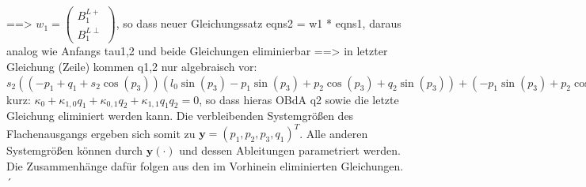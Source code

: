 ==> $w_1 = \left(\begin{matrix}
B_1^{L+} \\
B_1^{L\perp}
\end{matrix} \right)$, so dass neuer Gleichungssatz eqns2 = w1 * eqns1, daraus analog wie Anfangs tau1,2 und beide Gleichungen eliminierbar
==> in letzter Gleichung (Zeile) kommen q1,2 nur algebraisch vor:
$s_{2} \left(\left(- p_{1} + q_{1} + s_{2} \cos{\left(p_{3} \right)}\right) \left(l_{0} \sin{\left(p_{3} \right)} - p_{1} \sin{\left(p_{3} \right)} + p_{2} \cos{\left(p_{3} \right)} + q_{2} \sin{\left(p_{3} \right)}\right) + \left(- p_{1} \sin{\left(p_{3} \right)} + p_{2} \cos{\left(p_{3} \right)} + q_{1} \sin{\left(p_{3} \right)}\right) \left(l_{0} - p_{1} + q_{2} - s_{2} \cos{\left(p_{3} \right)}\right)\right) \left(l_{1} l_{2} m_{2} \left(g + \ddot{p}_{2}\right) - l_{1} \tau_{4} \left(p_{2} + s_{2} \sin{\left(p_{3} \right)}\right) - l_{2} \tau_{3} \left(p_{2} - s_{2} \sin{\left(p_{3} \right)}\right)\right) + s_{2} \left(l_{1} l_{2} m_{2} \ddot{p}_{1} + l_{1} \tau_{4} \left(l_{0} - p_{1} + q_{2} - s_{2} \cos{\left(p_{3} \right)}\right) + l_{2} \tau_{3} \left(- p_{1} + q_{1} + s_{2} \cos{\left(p_{3} \right)}\right)\right) \left(l_{0} p_{2} \sin{\left(p_{3} \right)} - l_{0} s_{2} \sin^{2}{\left(p_{3} \right)} - 2 p_{1} p_{2} \sin{\left(p_{3} \right)} + 2 p_{2}^{2} \cos{\left(p_{3} \right)} + p_{2} q_{1} \sin{\left(p_{3} \right)} + p_{2} q_{2} \sin{\left(p_{3} \right)} + q_{1} s_{2} \sin^{2}{\left(p_{3} \right)} - q_{2} s_{2} \sin^{2}{\left(p_{3} \right)}\right) + \left(\left(p_{2} - s_{2} \sin{\left(p_{3} \right)}\right) \left(l_{0} - p_{1} + q_{2} - s_{2} \cos{\left(p_{3} \right)}\right) - \left(p_{2} + s_{2} \sin{\left(p_{3} \right)}\right) \left(- p_{1} + q_{1} + s_{2} \cos{\left(p_{3} \right)}\right)\right) \left(J_{2} l_{1} l_{2} \ddot{p}_{3} + l_{1} s_{2} \tau_{4} \left(- l_{0} \sin{\left(p_{3} \right)} + p_{1} \sin{\left(p_{3} \right)} - p_{2} \cos{\left(p_{3} \right)} - q_{2} \sin{\left(p_{3} \right)}\right) + l_{2} s_{2} \tau_{3} \left(- p_{1} \sin{\left(p_{3} \right)} + p_{2} \cos{\left(p_{3} \right)} + q_{1} \sin{\left(p_{3} \right)}\right)\right) = 0$
kurz:
$\kappa_0 + \kappa_{1, 0} q_1+ \kappa_{0,1} q_2 + \kappa_{1, 1} q_1 q_2 = 0$, so dass hieras OBdA q2 sowie die letzte Gleichung eliminiert werden kann. Die verbleibenden Systemgrößen des Flachenausgangs ergeben sich somit zu $\mathbf{y} = (p_1, p_2, p_3, q_1)^T$. Alle anderen Systemgrößen können durch $\mathbf y(\cdot)$ und dessen Ableitungen parametriert werden. Die Zusammenhänge dafür folgen aus den im Vorhinein eliminierten Gleichungen.´ 

